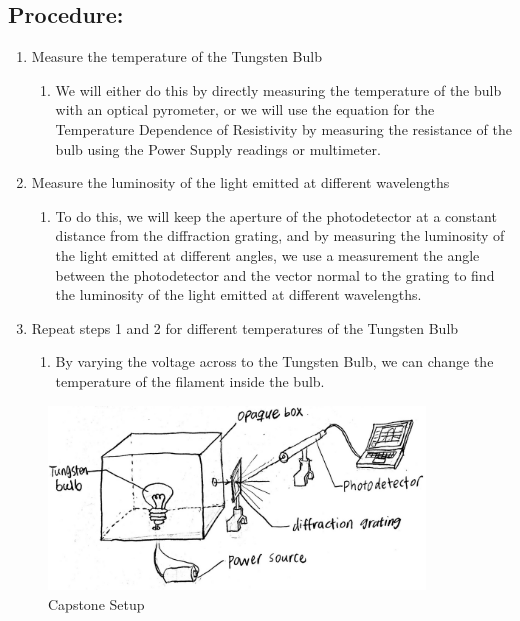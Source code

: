 \documentclass{article}
\begin{document}
\subsection{Procedure:} %
\label{sub:procedure_}
\begin{enumerate}
	\item Measure the temperature of the Tungsten Bulb
	\begin{enumerate}
		\item We will either do this by directly measuring the temperature of the bulb with an optical pyrometer, or we will use the equation for the Temperature Dependence of Resistivity by measuring the resistance of the bulb using the Power Supply readings or multimeter.
	\end{enumerate}
	\item	Measure the luminosity of the light emitted at different wavelengths
	\begin{enumerate}
		\item To do this, we will keep the aperture of the photodetector at a constant distance from the diffraction grating, and by measuring the luminosity of the light emitted at different angles, we use a measurement the angle between the photodetector and the vector normal to the grating to find the luminosity of the light emitted at different wavelengths. 
	\end{enumerate}
	\item	Repeat steps 1 and 2 for different temperatures of the Tungsten Bulb
	\begin{enumerate}
		\item By varying the voltage across to the Tungsten Bulb, we can change the temperature of the filament inside the bulb.
	\end{enumerate}
\end{enumerate}


\begin{figure}
  \includegraphics[width=10cm]{IMG-0011.jpg}
  \caption{Capstone Setup}
  \label{fig:boat1}
\end{figure}
\end{document}
